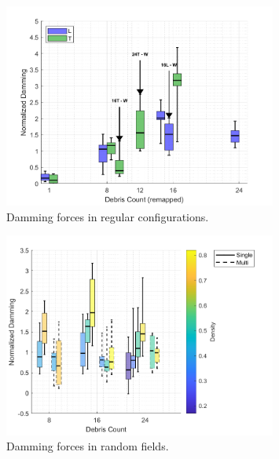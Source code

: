 \documentclass{article}
\begin{document}
\begin{figure}[htbp]
    \centering
    \includegraphics[width=0.8\textwidth]{Damming_Regular_L_T_SplitByTrial_Remapped.png}
    \caption{Damming forces in regular configurations.}
    \label{fig:damming_regular_remap}
\end{figure}

\begin{figure}[htbp]
    \centering
    \includegraphics[width=0.8\textwidth]{Damming_Random_Single_vs_Multi_ByDensityGradient.png}
    \caption{Damming forces in random fields.}
    \label{fig:damming_random}
\end{figure}

\end{document}
